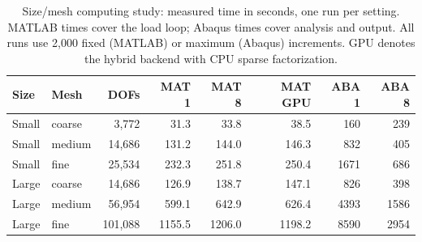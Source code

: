 \begin{table}[htbp]
\centering\small
\caption{Size/mesh computing study: measured time in seconds, one run per setting. MATLAB times cover the load loop; Abaqus times cover analysis and output. All runs use 2{,}000 fixed (MATLAB) or maximum (Abaqus) increments. GPU denotes the hybrid backend with CPU sparse factorization.}
\label{tab:scaling}
\begin{tabular}{llrrrrrr}
\hline
Size & Mesh & DOFs & MAT 1 & MAT 8 & MAT GPU & ABA 1 & ABA 8 \\
\hline
Small & coarse & 3,772 & 31.3 & 33.8 & 38.5 & 160 & 239 \\
Small & medium & 14,686 & 131.2 & 144.0 & 146.3 & 832 & 405 \\
Small & fine & 25,534 & 232.3 & 251.8 & 250.4 & 1671 & 686 \\
Large & coarse & 14,686 & 126.9 & 138.7 & 147.1 & 826 & 398 \\
Large & medium & 56,954 & 599.1 & 642.9 & 626.4 & 4393 & 1586 \\
Large & fine & 101,088 & 1155.5 & 1206.0 & 1198.2 & 8590 & 2954 \\
\hline
\end{tabular}
\end{table}
